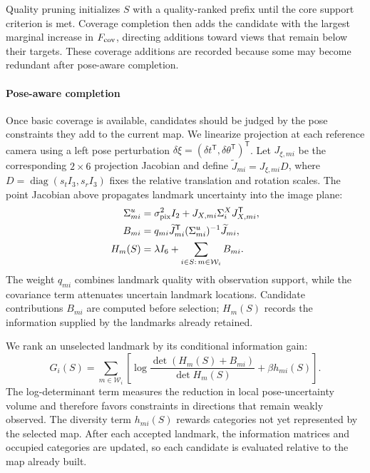 Quality pruning initializes $S$ with a quality-ranked prefix until the core support criterion is met. Coverage completion then adds the candidate with the largest marginal increase in $F_{\rm cov}$, directing additions toward views that remain below their targets. These coverage additions are recorded because some may become redundant after pose-aware completion.

\paragraph{Pose-aware completion}
Once basic coverage is available, candidates should be judged by the pose constraints they add to the current map. We linearize projection at each reference camera using a left pose perturbation $\delta\xi=(\delta t^\mathsf T,\delta\theta^\mathsf T)^\mathsf T$. Let $J_{\xi,mi}$ be the corresponding $2\times6$ projection Jacobian and define $\widetilde J_{mi}=J_{\xi,mi}D$, where $D=\operatorname{diag}(s_tI_3,s_rI_3)$ fixes the relative translation and rotation scales. The point Jacobian above propagates landmark uncertainty into the image plane:
\begin{equation}
\begin{aligned}
\Sigma^u_{mi}&=\sigma_{\rm pix}^2I_2+
J_{X,mi}\Sigma_i^XJ_{X,mi}^{\mathsf T},\\
B_{mi}&=q_{mi}\widetilde J_{mi}^{\mathsf T}
(\Sigma^u_{mi})^{-1}\widetilde J_{mi},\\
H_m(S)&=\lambda I_6+
\sum_{i\in S:\,m\in\mathcal W_i}B_{mi}.
\end{aligned}
\label{eq:information}
\end{equation}
The weight $q_{mi}$ combines landmark quality with observation support, while the covariance term attenuates uncertain landmark locations. Candidate contributions $B_{mi}$ are computed before selection; $H_m(S)$ records the information supplied by the landmarks already retained.

We rank an unselected landmark by its conditional information gain:
\begin{equation}
G_i(S)=\sum_{m\in\mathcal W_i}\left[
\log\frac{\det(H_m(S)+B_{mi})}{\det H_m(S)}
+\beta h_{mi}(S)
\right].
\label{eq:posegain}
\end{equation}
The log-determinant term measures the reduction in local pose-uncertainty volume and therefore favors constraints in directions that remain weakly observed. The diversity term $h_{mi}(S)$ rewards categories not yet represented by the selected map. After each accepted landmark, the information matrices and occupied categories are updated, so each candidate is evaluated relative to the map already built.

